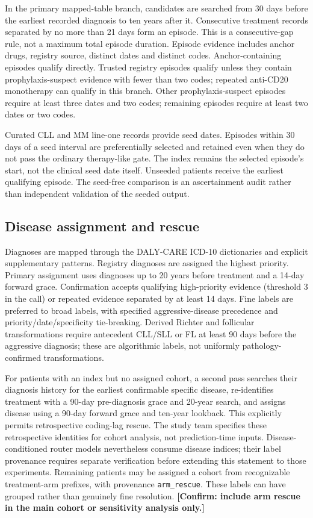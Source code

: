 \documentclass[10pt]{article}
\newcommand{\pending}[1]{\textbf{[Confirm: #1]}}
\begin{document}
In the primary mapped-table branch, candidates are searched from 30 days
before the earliest recorded diagnosis to ten years after it. Consecutive
treatment records separated by no more than 21 days form an episode. This is
a consecutive-gap rule, not a maximum total episode duration. Episode evidence
includes anchor drugs, registry source, distinct dates and distinct codes.
Anchor-containing episodes qualify directly. Trusted registry episodes qualify
unless they contain prophylaxis-suspect evidence with fewer than two codes;
repeated anti-CD20 monotherapy can qualify in this branch. Other
prophylaxis-suspect episodes require at least three dates and two codes;
remaining episodes require at least two dates or two codes.

Curated CLL and MM line-one records provide seed dates. Episodes within 30
days of a seed interval are preferentially selected and retained even when
they do not pass the ordinary therapy-like gate. The index remains the
selected episode's start, not the clinical seed date itself. Unseeded patients
receive the earliest qualifying episode. The seed-free comparison is an
ascertainment audit rather than independent validation of the seeded output.

\subsection*{Disease assignment and rescue}
Diagnoses are mapped through the DALY-CARE ICD-10 dictionaries and explicit
supplementary patterns. Registry diagnoses are assigned the highest priority.
Primary assignment uses diagnoses up to 20 years before treatment and a
14-day forward grace. Confirmation accepts qualifying high-priority evidence
(threshold 3 in the call) or repeated evidence separated by at least 14 days.
Fine labels are preferred to broad labels, with specified aggressive-disease
precedence and priority/date/specificity tie-breaking. Derived Richter and
follicular transformations require antecedent CLL/SLL or FL at least 90 days
before the aggressive diagnosis; these are algorithmic labels, not uniformly
pathology-confirmed transformations.

For patients with an index but no assigned cohort, a second pass searches
their diagnosis history for the earliest confirmable specific disease,
re-identifies treatment with a 90-day pre-diagnosis grace and 20-year search,
and assigns disease using a 90-day forward grace and ten-year lookback.
This explicitly permits retrospective coding-lag rescue.
The study team specifies these retrospective identities for cohort analysis,
not prediction-time inputs. Disease-conditioned router models nevertheless
consume disease indices; their label provenance requires separate verification
before extending this statement to those experiments.
Remaining patients may be assigned a cohort from recognizable treatment-arm
prefixes, with provenance \texttt{arm\_rescue}. These labels can have grouped
rather than genuinely fine resolution. \pending{include arm rescue in the
main cohort or sensitivity analysis only.}
\end{document}
